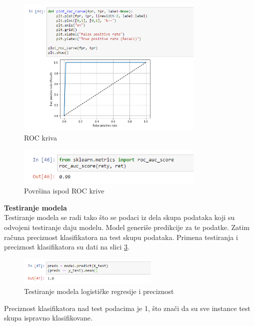 \documentclass[a4paper,12pt]{report}
\begin{document}
\begin{figure}[h]
    \centering
    \includegraphics[width=0.8\textwidth]{logistic_roc.png}
    \caption{ROC kriva}\label{fig:logisticroc}
\end{figure}

\begin{figure}[h]
    \centering
    \includegraphics[width=0.8\textwidth]{logistic_roc_score.png}
    \caption{Površina ispod ROC krive}\label{fig:logisticrocscore}
\end{figure}

\textbf{Testiranje modela}\\

Testiranje modela se radi tako što se podaci iz dela skupa podataka koji su odvojeni testiranje daju modelu. Model generiše predikcije za te podatke. Zatim računa preciznost klasifikatora na test skupu podataka. Primena testiranja i preciznost klasifikatora su dati na slici \ref{fig:logistictesting}. 

\begin{figure}[h]
    \centering
    \includegraphics[width=0.6\textwidth]{logistic_testing.png}
    \caption{Testiranje modela logističke regresije i preciznost}\label{fig:logistictesting}
\end{figure}

Preciznost klasifikatora nad test podacima je 1, što znači da su sve instance test skupa ispravno klasifikovane. \\
\end{document}
